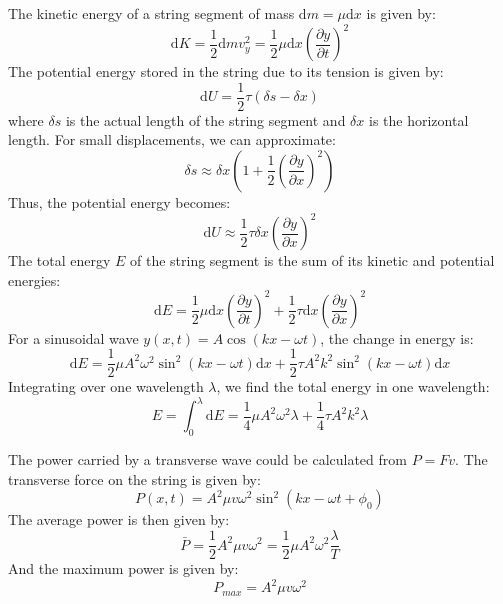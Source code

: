 \documentclass[11pt]{report}
\begin{document}
\begin{definition}
    The kinetic energy of a string segment of mass \( \text{d}m = \mu \text{d}x \) is given by:
    $$
        \text{d}K = \frac{1}{2} \text{d}m v_y^2 = \frac{1}{2} \mu \text{d}x \left(\frac{\partial y}{\partial t}\right)^2
    $$
    The potential energy stored in the string due to its tension is given by:
    $$
        \text{d}U = \frac{1}{2} \tau (\delta s - \delta x) 
    $$
    where \( \delta s \) is the actual length of the string segment and \( \delta x \) is the horizontal length. For small displacements, we can approximate:
    $$
        \delta s \approx \delta x \left(1 + \frac{1}{2}\left(\frac{\partial y}{\partial x}\right)^2\right)
    $$
    Thus, the potential energy becomes:
    $$
        \text{d}U \approx \frac{1}{2} \tau \delta x \left(\frac{\partial y}{\partial x}\right)^2
    $$
    The total energy \( E \) of the string segment is the sum of its kinetic and potential energies:
    $$
        \text{d}E = \frac{1}{2} \mu \text{d}x \left(\frac{\partial y}{\partial t}\right)^2 + \frac{1}{2} \tau \text{d}x \left(\frac{\partial y}{\partial x}\right)^2
    $$
    For a sinusoidal wave \( y(x,t) = A \cos(kx - \omega t) \), the change in energy is:
    $$
        \text{d}E = \frac{1}{2} \mu A^2 \omega^2 \sin^2(kx - \omega t) \text{d}x + \frac{1}{2} \tau A^2 k^2 \sin^2(kx - \omega t) \text{d}x
    $$
    Integrating over one wavelength \( \lambda \), we find the total energy in one wavelength:
    $$
        E = \int_0^\lambda \text{d}E = \frac{1}{4} \mu A^2 \omega^2 \lambda + \frac{1}{4} \tau A^2 k^2 \lambda
    $$
    
\end{definition}

\begin{definition}
   The power carried by a transverse wave could be calculated from $P=Fv$. The transverse force on the string is given by:
    $$
        P(x,t) = A^2 \mu v \omega^2 \sin^2(kx - \omega t + \phi_0)
    $$
    The average power is then given by:
    $$
        \bar{P} = \frac{1}{2} A^2 \mu v \omega^2 = \frac{1}{2} \mu A^2 \omega^2 \frac{\lambda}{T}
    $$
    And the maximum power is given by:
    $$
        P_{max} = A^2 \mu v \omega^2
    $$
\end{definition}
\end{document}
